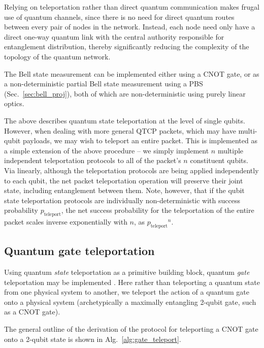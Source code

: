 Relying on teleportation rather than direct quantum communication makes frugal use of quantum channels, since there is no need for direct quantum routes between every pair of nodes in the network. Instead, each node need only have a direct one-way quantum link with the central authority responsible for entanglement distribution, thereby significantly reducing the complexity of the topology of the quantum network.

The Bell state measurement can be implemented either using a CNOT gate, or as a non-deterministic partial Bell state measurement using a PBS (Sec.~\ref{sec:bell_proj}), both of which are non-deterministic using purely linear optics.

The above describes quantum state teleportation at the level of single qubits. However, when dealing with more general QTCP packets, which may have multi-qubit payloads, we may wish to teleport an entire packet. This is implemented as a simple extension of the above procedure -- we simply implement $n$ multiple independent teleportation protocols to all of the packet's $n$ constituent qubits. Via linearly, although the teleportation protocols are being applied independently to each qubit, the net packet teleportation operation will preserve their joint state, including entanglement between them. Note, however, that if the qubit state teleportation protocols are individually non-deterministic with success probability $p_\mathrm{teleport}$, the net success probability for the teleportation of the entire packet scales inverse exponentially with $n$, as ${p_\mathrm{teleport}}^n$.

%
%

\subsection{Quantum gate teleportation} \label{sec:teleport_gate} 

Using quantum \textit{state} teleportation as a primitive building block, quantum \textit{gate} teleportation may be implemented \cite{bib:GottesmanChuang99}. Here rather than teleporting a quantum state from one physical system to another, we teleport the action of a quantum gate onto a physical system (archetypically a maximally entangling 2-qubit gate, such as a CNOT gate).

The general outline of the derivation of the protocol for teleporting a CNOT gate onto a 2-qubit state is shown in Alg.~\ref{alg:gate_teleport}.

